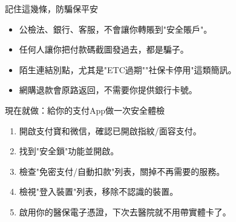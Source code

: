\begin{tcbwarn}{記住這幾條，防騙保平安}
\begin{itemize}
  \item 公檢法、銀行、客服，不會讓你轉賬到"安全賬戶"。
  \item 任何人讓你把付款碼截圖發過去，都是騙子。
  \item 陌生連結別點，尤其是"ETC過期""社保卡停用"這類簡訊。
  \item 網購退款會原路返回，不需要你提供銀行卡號。
\end{itemize}

\end{tcbwarn}

\begin{tcbpractice}{現在就做：給你的支付App做一次安全體檢}
\begin{enumerate}
  \item 開啟支付寶和微信，確認已開啟指紋/面容支付。
  \item 找到"安全鎖"功能並開啟。
  \item 檢查"免密支付/自動扣款"列表，關掉不再需要的服務。
  \item 檢視"登入裝置"列表，移除不認識的裝置。
  \item 啟用你的醫保電子憑證，下次去醫院就不用帶實體卡了。
\end{enumerate}

\end{tcbpractice}
